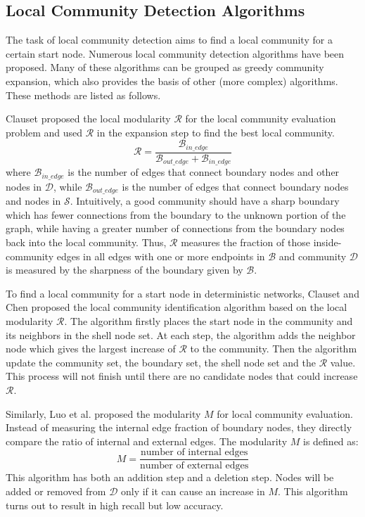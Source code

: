 \documentclass[\main/thesis.tex]{subfiles}
\begin{document}
\subsection{Local Community Detection Algorithms} \label{Local-Community-Detection-Algorithms-Review}
The task of local community detection aims to find a local community for a certain start node. Numerous local community detection algorithms have been proposed. Many of these algorithms can be grouped as greedy community expansion, which also provides the basis of other (more complex) algorithms. These methods are listed as follows.

Clauset \cite{clauset2005finding} proposed the local modularity $\mathcal{R}$ for the local community evaluation problem and used $\mathcal{R}$ in the expansion step to find the best local community.
\begin{equation}
\mathcal{R} = \frac{\mathcal{B}_{in\_edge}}{\mathcal{B}_{out\_edge}+\mathcal{B}_{in\_edge}}
\end{equation}
where $\mathcal{B}_{in\_edge}$ is the number of edges that connect boundary nodes and other nodes in $\mathcal{D}$, while $\mathcal{B}_{out\_edge}$ is the number of edges that connect boundary nodes and nodes in $\mathcal{S}$. Intuitively, a good community should have a sharp boundary which has fewer connections from the boundary to the unknown portion of the graph, while having a greater number of connections from the boundary nodes back into the local community. Thus, $\mathcal{R}$ measures the fraction of those inside-community edges in all edges with one or more endpoints in $\mathcal{B}$ and community $\mathcal{D}$ is measured by the sharpness of the boundary given by $\mathcal{B}$.

To find a local community for a start node in deterministic networks, Clauset \cite{clauset2005finding} and Chen \cite{chen2009detecting} proposed the local community identification algorithm based on the local modularity $\mathcal{R}$. The algorithm firstly places the start node in the community and its neighbors in the shell node set. At each step, the algorithm adds the neighbor node which gives the largest increase of $\mathcal{R}$ to the community. Then the algorithm update the community set, the boundary set, the shell node set and the $\mathcal{R}$ value. This process will not finish until there are no candidate nodes that could increase $\mathcal{R}$.

Similarly, Luo et al. \cite{luo2008exploring} proposed the modularity $M$ for local community evaluation. Instead of measuring the internal edge fraction of boundary nodes, they directly compare the ratio of internal and external edges. The modularity $M$ is defined as:
\begin{equation}
M = \frac{\text{number of internal edges}}{\text{number of external edges}}
\end{equation}
This algorithm has both an addition step and a deletion step. Nodes will be added or removed from $\mathcal{D}$ only if it can cause an increase in $M$. This algorithm turns out to result in high recall but low accuracy.
\end{document}
